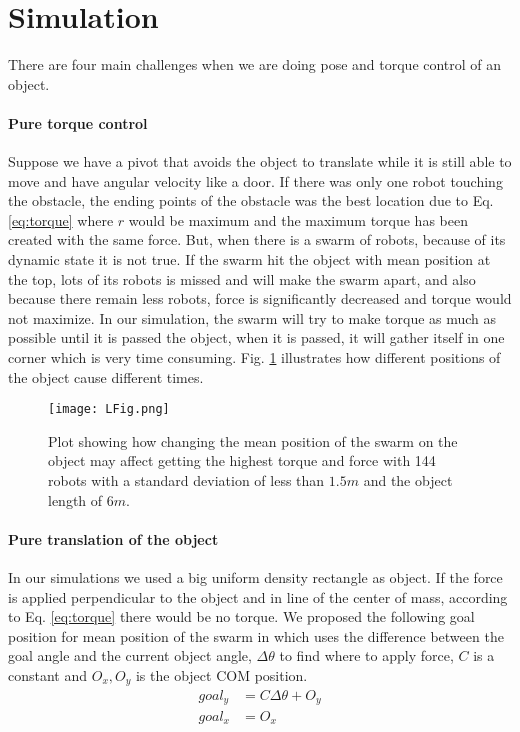 
\section{Simulation}\label{sec:simulation}
There are four main challenges when we are doing pose and torque control of an object. 
\paragraph{Pure torque control} 
Suppose we have a pivot that avoids the object to translate while it is still able to move and have angular velocity like a door. If there was only one robot touching the obstacle, the ending points of the obstacle was the best location due to Eq. \ref{eq:torque} where $r$ would be maximum and the maximum torque has been created with the same force. But, when there is a swarm of robots, because of its dynamic state it is not true. If the swarm hit the object with mean position at the top, lots of its robots is missed and will make the swarm apart, and also because there remain less robots, force is significantly decreased and torque would not maximize. In our simulation, the swarm will try to make torque as much as possible until it is passed the object, when it is passed, it will gather itself in one corner which is very time consuming. Fig. \ref{fig:LFig} illustrates how different positions of the object cause different times. 

\begin{figure}
\begin{center}
	\texttt{[image: LFig.png]}
\end{center}
\vspace{-1em}
\caption{\label{fig:LFig}
Plot showing how changing the mean position of the swarm on the object may affect getting the highest torque and force with 144 robots with a standard deviation of less than $1.5 m$ and the object length of $6m$.
}
\vspace{-1em}
\end{figure}
\paragraph{Pure translation of the object}
In our simulations we used a big uniform density rectangle as object. If the force is applied perpendicular to the object and in line of the center of mass, according to Eq. \ref{eq:torque} there would be no torque. We proposed the following goal position for mean position of the swarm in which uses the difference between the goal angle and the current object angle, $\Delta \theta$ to find where to apply force, $C$ is a constant and $O_x,O_y$ is the object COM position.
\begin{align}\nonumber
goal_y &= C \Delta \theta + O_y\\
goal_x &= O_x
\end{align}

